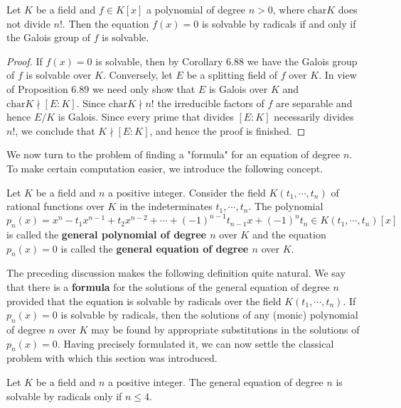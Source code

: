 \begin{corollary}
Let $K$ be a field and $f\in K[x]$ a polynomial of degree $n>0$, where $\mathrm{char}K$ does not divide $n!$. Then the equation $f(x)=0$ is solvable by radicals if and only if the Galois group of $f$ is solvable.
\end{corollary}
\begin{proof}
If $f(x)=0$ is solvable, then by Corollary 6.88 we have the Galois group of $f$ is solvable over $K$. Conversely, let $E$ be a splitting field of $f$ over $K$. In view of Proposition 6.89 we need only show that $E$ is Galois over $K$ and $\mathrm{char}K\nmid [E:K]$. Since $\mathrm{char}K\nmid n!$ the irreducible factors of $f$ are separable and hence $E/K$ is Galois. Since every prime that divides $[E:K]$ necessarily divides $n!$, we conclude that $K\nmid [E:K]$, and hence the proof is finished.
\end{proof}
We now turn to the problem of finding a "formula" for an equation of degree $n$. To make certain computation easier, we introduce the following concept.
\begin{definition}
Let $K$ be a field and $n$ a positive integer. Consider the field $K(t_1,\cdots,t_n)$ of rational functions over $K$ in the indeterminates $t_1,\cdots,t_n$. The polynomial 
$$
p_n\left( x \right) =x^n-t_1x^{n-1}+t_2x^{n-2}+\cdots +\left( -1 \right) ^{n-1}t_{n-1}x+\left( -1 \right) ^nt_n\in K\left( t_1,\cdots ,t_n \right) \left[ x \right] 
$$
is called the \textbf{general polynomial of degree $n$} over $K$ and the equation $p_n(x)=0$ is called the \textbf{general equation of degree $n$} over $K$.
\end{definition}
The preceding discussion makes the following definition quite natural. We say that there is a \textbf{formula} for the solutions of the general equation of degree $n$ provided that the equation is solvable by radicals over the field $K(t_1,\cdots,t_n)$. If $p_n(x)=0$ is solvable by radicals, then the solutions of any (monic) polynomial of degree $n$ over $K$ may be found by appropriate substitutions in the solutions of $p_n(x)=0$. Having precisely formulated it, we can now settle the classical problem with which this section was introduced.
\begin{proposition}
Let $K$ be a field and $n$ a positive integer. The general equation of degree $n$ is solvable by radicals only if $n\le 4$.
\end{proposition}
